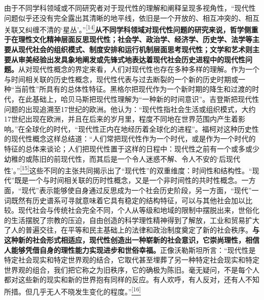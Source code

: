 \documentclass[UTF8, fontset = sourcesans, a4paper, oneside, zihao =
-4, scheme=chinese, no-math, space=true]{ctexbook}
\begin{document}
由于不同学科领域或不同研究者对于现代性的理解和阐释呈现多视角性，``现代性问题似乎还没有完全露出其清晰的地平线，依旧是一个开放的、相互冲突的、相互关联又纠缠不清的`星丛'。''\protect\hypertarget{part0005_split_002.htmlux5cux23w14}{}{}\protect\hyperlink{part0005_split_003.htmlux5cux23m14}{\textsuperscript{{[}14{]}}}\textbf{从不同学科领域对现代性问题的研究来说，哲学侧重于在理性文化精神层面反思现代性；社会学、政治学、经济学、历史学、法学等主要从现代社会的组织模式、制度安排和运行机制层面思考现代性；文学和艺术则主要从审美经验出发具象地阐发或先锋式地表达着现代社会历史进程中的现代性问题。}从对现代性概念的界定来看，人们对现代性也存在多种多样的理解。作为一个与时间相关联的历史性概念，现代性代表与过去断裂的一个新的历史时期或一种``当前性''所具有的总体性特征。黑格尔把现代作为一个新时期的降生和过渡的时代，在此基础上，哈贝马斯把现代性理解为``一种新的时间意识''。吉登斯把现代性问题的出现追溯至17世纪的欧洲。他认为：``现代性指社会生活或组织模式，大约17世纪出现在欧洲，并且在后来的岁月里，程度不同地在世界范围内产生着影响。''在全球化的时代，``现代性正内在地经历着全球化的进程''。福柯对这种历史性的现代性概念这样总结道：``人们常把现代性作为一个时代，或是作为一个时代的特征的总体来谈论；人们把现代性置于这样的日程中：现代性之前有一个或多或少幼稚的或陈旧的前现代性，而其后是一个令人迷惑不解、令人不安的`后现代性'。''\protect\hypertarget{part0005_split_002.htmlux5cux23w15}{}{}\protect\hyperlink{part0005_split_003.htmlux5cux23m15}{\textsuperscript{{[}15{]}}}这些不同的主张共同揭示出了``现代性''的双重维度：时间性和结构性。``现代''既是一个与时间相关联的历时性概念，又是一个非时间性的共时性概念。一方面，``现代''表示能够使自身通过反思成为一个社会历史阶段，另一方面，``现代''一词既然有历史谱系可寻就意味着它具有稳定的结构特征，可以与其他社会加以比较。现代社会与传统社会完全不同，个人从等级和地域的限制中摆脱出来，世俗化的生活摆脱了宗教的压迫，自由创造的科学理性精神得到了解放，工业和贸易扩大了人的普遍交往，在平等和民主基础上的法律和政治制度奠定了新的社会秩序。\textbf{与这种新的社会形式相适应，现代性创造出一种崭新的社会意识，它崇尚理性，相信人能够凭借自身的理性能力实现进步和世俗幸福。}正像沃勒斯坦所言：``现代性是特定社会现实和特定世界观的结合，它取代甚至埋葬了另一种特定社会现实和特定世界观的组合，我们把它称之为旧秩序，它的确极为陈旧。毫无疑问，不是每个人都对这些新的现实和新的世界抱有同样的反应。有人欢呼，有人反对，还有人不知所措。但几乎无人不晓发生变化的程度。''\protect\hypertarget{part0005_split_002.htmlux5cux23w16}{}{}\protect\hyperlink{part0005_split_003.htmlux5cux23m16}{\textsuperscript{{[}16{]}}}
\end{document}
